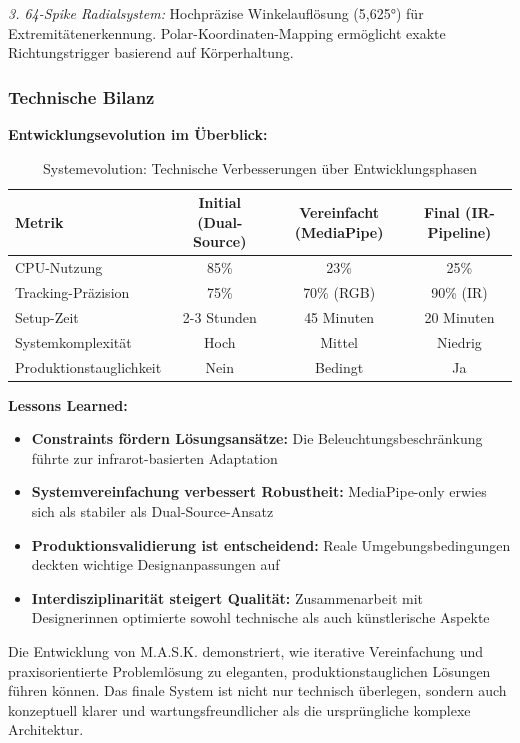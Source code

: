 \textit{3. 64-Spike Radialsystem:}
Hochpräzise Winkelauflösung (5,625°) für Extremitätenerkennung. Polar-Koordinaten-Mapping ermöglicht exakte Richtungstrigger basierend auf Körperhaltung.

\newpage

\subsubsection{Technische Bilanz}

\textbf{Entwicklungsevolution im Überblick:}
\begin{table}[H]
    \centering
    \begin{tabular}{|l|c|c|c|}
        \hline
        \textbf{Metrik} & \textbf{Initial (Dual-Source)} & \textbf{Vereinfacht (MediaPipe)} & \textbf{Final (IR-Pipeline)} \\ \hline
        CPU-Nutzung & 85\% & 23\% & 25\% \\ \hline
        Tracking-Präzision & 75\% & 70\% (RGB) & 90\% (IR) \\ \hline
        Setup-Zeit & 2-3 Stunden & 45 Minuten & 20 Minuten \\ \hline
        Systemkomplexität & Hoch & Mittel & Niedrig \\ \hline
        Produktionstauglichkeit & Nein & Bedingt & Ja \\ \hline
    \end{tabular}
    \caption{Systemevolution: Technische Verbesserungen über Entwicklungsphasen}
    \label{tab:system_evolution}
\end{table}

\textbf{Lessons Learned:}
\begin{itemize}
    \item \textbf{Constraints fördern Lösungsansätze:} Die Beleuchtungsbeschränkung führte zur infrarot-basierten Adaptation
    \item \textbf{Systemvereinfachung verbessert Robustheit:} MediaPipe-only erwies sich als stabiler als Dual-Source-Ansatz
    \item \textbf{Produktionsvalidierung ist entscheidend:} Reale Umgebungsbedingungen deckten wichtige Designanpassungen auf
    \item \textbf{Interdisziplinarität steigert Qualität:} Zusammenarbeit mit Designerinnen optimierte sowohl technische als auch künstlerische Aspekte
\end{itemize}

Die Entwicklung von M.A.S.K. demonstriert, wie iterative Vereinfachung und praxisorientierte Problemlösung zu eleganten, produktionstauglichen Lösungen führen können. Das finale System ist nicht nur technisch überlegen, sondern auch konzeptuell klarer und wartungsfreundlicher als die ursprüngliche komplexe Architektur.